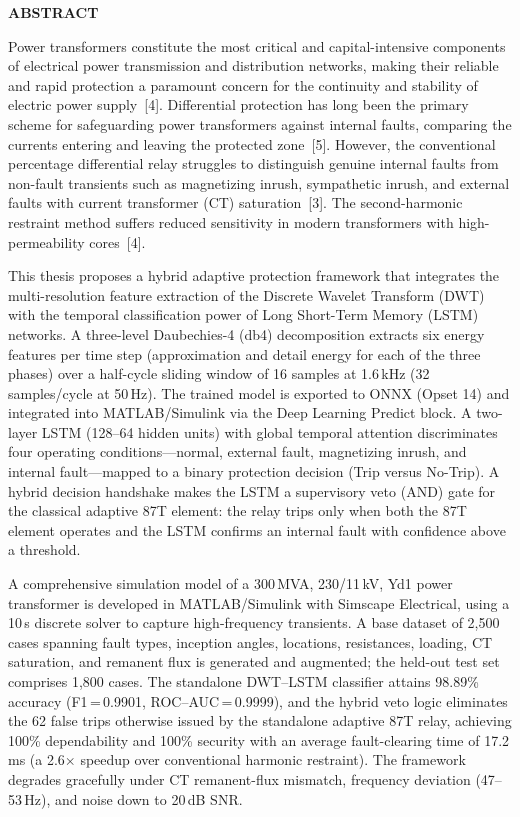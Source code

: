 \documentclass[12pt,a4paper,oneside]{report}
\newcommand{\frontchap}[1]{%
  \clearpage\thispagestyle{fancy}%
  \begin{center}\Large\bfseries #1\end{center}\vspace{6pt}%
  \addcontentsline{toc}{chapter}{#1}}
\begin{document}
\frontchap{ABSTRACT}
Power transformers constitute the most critical and capital-intensive components of electrical power transmission and distribution networks, making their reliable and rapid protection a paramount concern for the continuity and stability of electric power supply~[4]. Differential protection has long been the primary scheme for safeguarding power transformers against internal faults, comparing the currents entering and leaving the protected zone~[5]. However, the conventional percentage differential relay struggles to distinguish genuine internal faults from non-fault transients such as magnetizing inrush, sympathetic inrush, and external faults with current transformer (CT) saturation~[3]. The second-harmonic restraint method suffers reduced sensitivity in modern transformers with high-permeability cores~[4].

This thesis proposes a hybrid adaptive protection framework that integrates the multi-resolution feature extraction of the Discrete Wavelet Transform (DWT) with the temporal classification power of Long Short-Term Memory (LSTM) networks. A three-level Daubechies-4 (db4) decomposition extracts six energy features per time step (approximation and detail energy for each of the three phases) over a half-cycle sliding window of 16 samples at 1.6\,kHz (32 samples/cycle at 50\,Hz). The trained model is exported to ONNX (Opset 14) and integrated into MATLAB/Simulink via the Deep Learning Predict block. A two-layer LSTM (128--64 hidden units) with global temporal attention discriminates four operating conditions---normal, external fault, magnetizing inrush, and internal fault---mapped to a binary protection decision (Trip versus No-Trip). A hybrid decision handshake makes the LSTM a supervisory veto (AND) gate for the classical adaptive 87T element: the relay trips only when both the 87T element operates and the LSTM confirms an internal fault with confidence above a threshold.

A comprehensive simulation model of a 300\,MVA, 230/11\,kV, Yd1 power transformer is developed in MATLAB/Simulink with Simscape Electrical, using a 10\,\textmu s discrete solver to capture high-frequency transients. A base dataset of 2{,}500 cases spanning fault types, inception angles, locations, resistances, loading, CT saturation, and remanent flux is generated and augmented; the held-out test set comprises 1{,}800 cases. The standalone DWT--LSTM classifier attains 98.89\% accuracy (F1\,=\,0.9901, ROC--AUC\,=\,0.9999), and the hybrid veto logic eliminates the 62 false trips otherwise issued by the standalone adaptive 87T relay, achieving 100\% dependability and 100\% security with an average fault-clearing time of 17.2\,ms (a 2.6$\times$ speedup over conventional harmonic restraint). The framework degrades gracefully under CT remanent-flux mismatch, frequency deviation (47--53\,Hz), and noise down to 20\,dB SNR.
\end{document}
